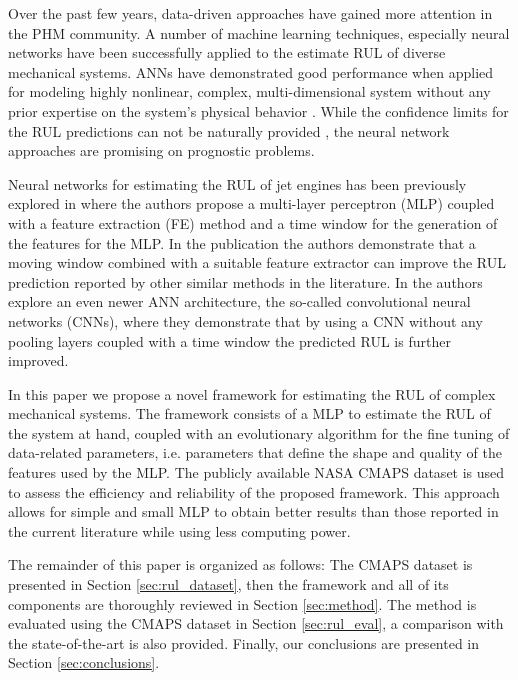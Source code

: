 \documentclass[12pt]{IEEEtran}%
\begin{document}
Over the past few years, data-driven approaches have gained more attention in the PHM community. A number of machine learning techniques, especially neural networks have been successfully applied to the estimate RUL of diverse mechanical systems. ANNs have demonstrated good performance when applied for modeling highly nonlinear, complex, multi-dimensional system without any prior expertise on the system's physical behavior \cite{Li2018}. While the confidence limits for the RUL predictions can not be naturally provided \cite{Sikorska2011}, the neural network approaches are promising on prognostic problems.

Neural networks for estimating the RUL of jet engines has been previously explored in \cite{Lim2016} where the authors propose a multi-layer perceptron (MLP) coupled with a feature extraction (FE) method and a time window for the generation of the features for the MLP. In the publication the authors demonstrate that a moving window combined with a suitable feature extractor can improve the RUL prediction reported by other similar methods in the literature. In \cite{Li2018} the authors explore an even newer ANN architecture, the so-called convolutional neural networks (CNNs), where they demonstrate that by using a CNN without any pooling layers coupled with a time window the predicted RUL is further improved.

In this paper we propose a novel framework for estimating the RUL of complex mechanical systems. The framework consists of a MLP to estimate the RUL of the system at hand, coupled with an evolutionary algorithm for the fine tuning of data-related parameters, i.e. parameters that define the shape and quality of the features used by the MLP. The publicly available NASA CMAPS dataset \cite{CMAPS2008} is used to assess the efficiency and reliability of the proposed framework. This approach allows for simple and small MLP to obtain better results than those reported in the current literature while using less computing power. 

The remainder of this paper is organized as follows: The CMAPS dataset is presented in Section \ref{sec:rul_dataset}, then the framework and all of its components are thoroughly reviewed in Section \ref{sec:method}. The method is evaluated using the CMAPS dataset in Section \ref{sec:rul_eval}, a comparison with the state-of-the-art is also provided. Finally, our conclusions are presented in Section \ref{sec:conclusions}.

\end{document}
